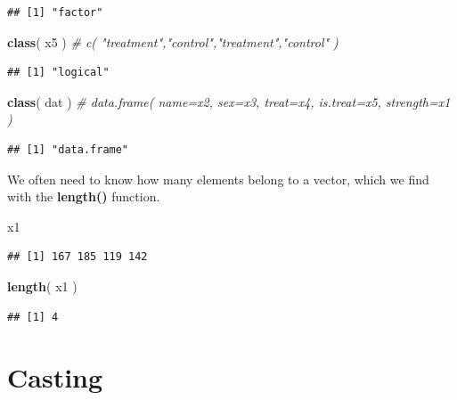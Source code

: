 \documentclass[]{book}
\newenvironment{Shaded}{\begin{snugshade}}{\end{snugshade}}
\newcommand{\CommentTok}[1]{\textcolor[rgb]{0.56,0.35,0.01}{\textit{#1}}}
\newcommand{\KeywordTok}[1]{\textcolor[rgb]{0.13,0.29,0.53}{\textbf{#1}}}
\newcommand{\NormalTok}[1]{#1}
\theoremstyle{definition}
\theoremstyle{definition}
\theoremstyle{definition}
\theoremstyle{remark}
\begin{document}
\begin{verbatim}
## [1] "factor"
\end{verbatim}

\begin{Shaded}
\begin{Highlighting}[]
\KeywordTok{class}\NormalTok{( x5 )   }\CommentTok{# c( "treatment","control","treatment","control" )}
\end{Highlighting}
\end{Shaded}

\begin{verbatim}
## [1] "logical"
\end{verbatim}

\begin{Shaded}
\begin{Highlighting}[]
\KeywordTok{class}\NormalTok{( dat )  }\CommentTok{# data.frame( name=x2, sex=x3, treat=x4, is.treat=x5, strength=x1 )}
\end{Highlighting}
\end{Shaded}

\begin{verbatim}
## [1] "data.frame"
\end{verbatim}

We often need to know how many elements belong to a vector, which we
find with the \textbf{length()} function.

\begin{Shaded}
\begin{Highlighting}[]
\NormalTok{x1}
\end{Highlighting}
\end{Shaded}

\begin{verbatim}
## [1] 167 185 119 142
\end{verbatim}

\begin{Shaded}
\begin{Highlighting}[]
\KeywordTok{length}\NormalTok{( x1 )}
\end{Highlighting}
\end{Shaded}

\begin{verbatim}
## [1] 4
\end{verbatim}

\hypertarget{casting}{%
\section{Casting}\label{casting}}
\end{document}

